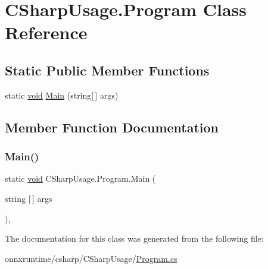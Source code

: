 \hypertarget{classCSharpUsage_1_1Program}{}\section{C\+Sharp\+Usage.\+Program Class Reference}
\label{classCSharpUsage_1_1Program}
\subsection*{Static Public Member Functions}
\begin{DoxyCompactItemize}
\item 
static \mbox{\hyperlink{mlasi_8h_a88f941d423cb2a819b70a1358982b1a6}{void}} \mbox{\hyperlink{classCSharpUsage_1_1Program_ae5f9ba8a4eb6bf47a5af6bea5390b495}{Main}} (string\mbox{[}$\,$\mbox{]} args)
\end{DoxyCompactItemize}


\subsection{Member Function Documentation}
\mbox{\label{classCSharpUsage_1_1Program_ae5f9ba8a4eb6bf47a5af6bea5390b495}} 
\subsubsection{\texorpdfstring{Main()}{Main()}}
{\footnotesize\ttfamily static \mbox{\hyperlink{mlasi_8h_a88f941d423cb2a819b70a1358982b1a6}{void}} C\+Sharp\+Usage.\+Program.\+Main (\begin{DoxyParamCaption}\item[{string \mbox{[}$\,$\mbox{]}}]{args }\end{DoxyParamCaption})\hspace{0.3cm}{\ttfamily [inline]}, {\ttfamily [static]}}



The documentation for this class was generated from the following file\+:\begin{DoxyCompactItemize}
\item 
onnxruntime/csharp/\+C\+Sharp\+Usage/\mbox{\hyperlink{Program_8cs}{Program.\+cs}}\end{DoxyCompactItemize}
